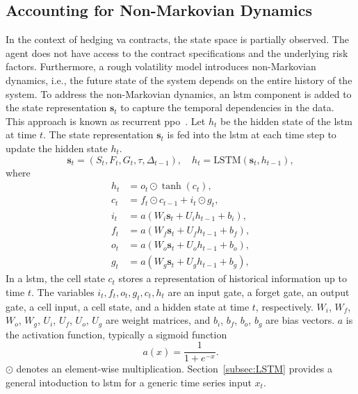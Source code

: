 \subsection{Accounting for Non-Markovian Dynamics}

In the context of hedging \gls{va} contracts, the state space is partially observed.
The agent does not have access to the contract specifications and the underlying risk factors.
Furthermore, a rough volatility model introduces non-Markovian dynamics, i.e., the future state of the system depends on the entire history of the system.
To address the non-Markovian dynamics, an \gls{lstm} component is added to the state representation $\mathbf{s}_t$ to capture the temporal dependencies in the data.
This approach is known as recurrent \gls{ppo}~\citep{ni2021recurrent}.
Let $h_t$ be the hidden state of the \gls{lstm} at time $t$.
The state representation $\mathbf{s}_t$ is fed into the \gls{lstm} at each time step to update the hidden state $h_t$.
\begin{equation} \label{eq3:stateRNN}
    \mathbf{s}_t = (S_t, F_t, G_t, \tau, \Delta_{t-1}), \quad h_t = \text{LSTM}(\mathbf{s}_t, h_{t-1}),
\end{equation}
where 
\begin{align} 
    h_t &= o_t \odot \tanh(c_t), \nonumber \\
    c_t &= f_t \odot c_{t-1} + i_t \odot g_t, \nonumber \\
    i_t &= a(W_i \mathbf{s}_t + U_i h_{t-1} + b_i), \nonumber \\
    f_t &= a(W_f \mathbf{s}_t + U_f h_{t-1} + b_f), \nonumber \\
    o_t &= a(W_o \mathbf{s}_t + U_o h_{t-1} + b_o), \nonumber \\
    g_t &= a(W_g \mathbf{s}_t + U_g h_{t-1} + b_g), 
\end{align}
In a \gls{lstm}, the cell state $c_t$ stores a representation of historical information up to time $t$.
The variables $i_t, f_t, o_t, g_t, c_t, h_t$ are an input gate, a forget gate, an output gate, a cell input, a cell state, and a hidden state at time $t$, respectively.
$W_i$, $W_f$, $W_o$, $W_g$, $U_i$, $U_f$, $U_o$, $U_g$ are weight matrices, and $b_i$, $b_f$, $b_o$, $b_g$ are bias vectors.
$a$ is the activation function, typically a sigmoid function 
\begin{equation} \label{eq3:sigmoid}
    a(x) = \frac{1}{1 + e^{-x}}.
\end{equation}
$\odot$ denotes an element-wise multiplication.
Section~\ref{subsec:LSTM} provides a general intoduction to \gls{lstm} for a generic time series input $x_t$.

